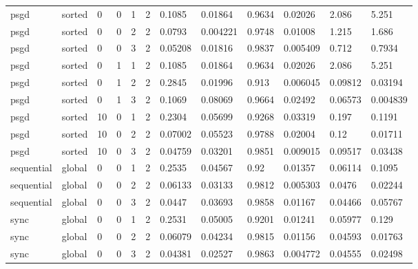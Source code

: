 \begin{tabular}{llllllllllll}
psgd & sorted & 0 & 0 & 1 & 2 & 0.1085 & 0.01864 & 0.9634 & 0.02026 & 2.086 & 5.251 \\
psgd & sorted & 0 & 0 & 2 & 2 & 0.0793 & 0.004221 & 0.9748 & 0.01008 & 1.215 & 1.686 \\
psgd & sorted & 0 & 0 & 3 & 2 & 0.05208 & 0.01816 & 0.9837 & 0.005409 & 0.712 & 0.7934 \\
psgd & sorted & 0 & 1 & 1 & 2 & 0.1085 & 0.01864 & 0.9634 & 0.02026 & 2.086 & 5.251 \\
psgd & sorted & 0 & 1 & 2 & 2 & 0.2845 & 0.01996 & 0.913 & 0.006045 & 0.09812 & 0.03194 \\
psgd & sorted & 0 & 1 & 3 & 2 & 0.1069 & 0.08069 & 0.9664 & 0.02492 & 0.06573 & 0.004839 \\
psgd & sorted & 10 & 0 & 1 & 2 & 0.2304 & 0.05699 & 0.9268 & 0.03319 & 0.197 & 0.1191 \\
psgd & sorted & 10 & 0 & 2 & 2 & 0.07002 & 0.05523 & 0.9788 & 0.02004 & 0.12 & 0.01711 \\
psgd & sorted & 10 & 0 & 3 & 2 & 0.04759 & 0.03201 & 0.9851 & 0.009015 & 0.09517 & 0.03438 \\
sequential & global & 0 & 0 & 1 & 2 & 0.2535 & 0.04567 & 0.92 & 0.01357 & 0.06114 & 0.1095 \\
sequential & global & 0 & 0 & 2 & 2 & 0.06133 & 0.03133 & 0.9812 & 0.005303 & 0.0476 & 0.02244 \\
sequential & global & 0 & 0 & 3 & 2 & 0.0447 & 0.03693 & 0.9858 & 0.01167 & 0.04466 & 0.05767 \\
sync & global & 0 & 0 & 1 & 2 & 0.2531 & 0.05005 & 0.9201 & 0.01241 & 0.05977 & 0.129 \\
sync & global & 0 & 0 & 2 & 2 & 0.06079 & 0.04234 & 0.9815 & 0.01156 & 0.04593 & 0.01763 \\
sync & global & 0 & 0 & 3 & 2 & 0.04381 & 0.02527 & 0.9863 & 0.004772 & 0.04555 & 0.02498 \\
\hline
\end{tabular}
